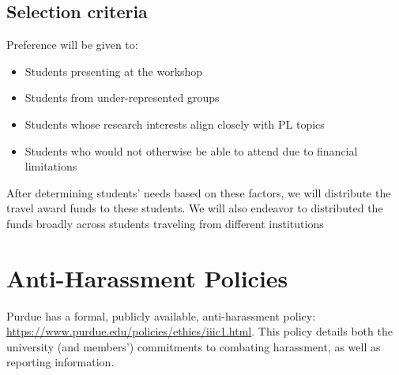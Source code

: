 \documentclass[11pt]{article}
\begin{document}
\subsection{Selection criteria}

Preference will be given to: 

\begin{itemize}
\item Students presenting at the workshop
\item Students from under-represented groups
\item Students whose research interests align closely with PL topics
\item Students who would not otherwise be able to attend due to
financial limitations
\end{itemize}

After determining students' needs based on these
factors, we will distribute the travel award funds to
these students. We will also endeavor to distributed the funds broadly across students traveling from different institutions

\section{Anti-Harassment Policies}

Purdue has a formal, publicly available, anti-harassment policy: \\\url{https://www.purdue.edu/policies/ethics/iiic1.html}. This policy details both the university (and members') commitments to combating harassment, as well as reporting information.
\end{document}

